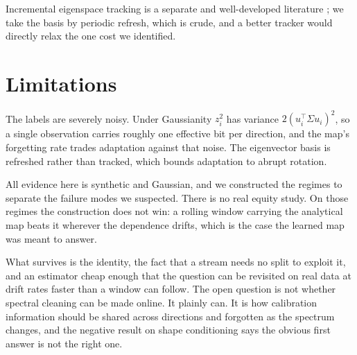 \documentclass[11pt]{article}
\begin{document}
Incremental eigenspace tracking is a separate and well-developed literature
\citep{weng2003ccipca}; we take the basis by periodic refresh, which is crude, and a better tracker
would directly relax the one cost we identified.

\section{Limitations}

The labels are severely noisy. Under Gaussianity $z_i^2$ has variance $2(u_i^\top \Sigma u_i)^2$, so
a single observation carries roughly one effective bit per direction, and the map's forgetting rate
trades adaptation against that noise. The eigenvector basis is refreshed rather than tracked, which
bounds adaptation to abrupt rotation.

All evidence here is synthetic and Gaussian, and we constructed the regimes to separate the failure
modes we suspected. There is no real equity study. On those regimes the construction does not win: a
rolling window carrying the analytical map beats it wherever the dependence drifts, which is the case
the learned map was meant to answer.

What survives is the identity, the fact that a stream needs no split to exploit it, and an estimator
cheap enough that the question can be revisited on real data at drift rates faster than a window can
follow. The open question is not whether spectral cleaning can be made online. It plainly can. It is
how calibration information should be shared across directions and forgotten as the spectrum changes,
and the negative result on shape conditioning says the obvious first answer is not the right one.


\end{document}
